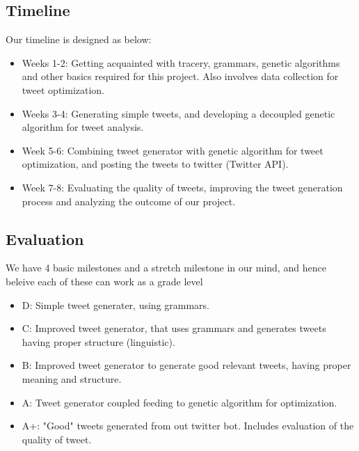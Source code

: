 \documentclass[11pt]{article}
\begin{document}
        \subsection{Timeline}
        Our timeline is designed as below:
        \begin{itemize}
            \item Weeks 1-2: Getting acquainted with tracery, grammars, genetic algorithms and other basics required for this project. Also involves data collection for tweet optimization.
            \item Weeks 3-4: Generating simple tweets, and developing a decoupled genetic algorithm for tweet analysis.
            \item Week 5-6: Combining tweet generator with genetic algorithm for tweet optimization, and posting the tweets to twitter (Twitter API).
            \item Week 7-8: Evaluating the quality of tweets, improving the tweet generation process and analyzing the outcome of our project.
        \end{itemize}

        \subsection{Evaluation}
        We have 4 basic milestones and a stretch milestone in our mind, and hence beleive each of these can work as a grade level
        \begin{itemize}
            \item D: Simple tweet generater, using grammars.
            \item C: Improved tweet generator, that uses grammars and generates tweets having proper structure (linguistic).
            \item B: Improved tweet generator to generate good relevant tweets, having proper meaning and structure.
            \item A: Tweet generator coupled feeding to genetic algorithm for optimization.
            \item A+: "Good" tweets generated from out twitter bot. Includes evaluation of the quality of tweet. 
        \end{itemize}
\end{document}
